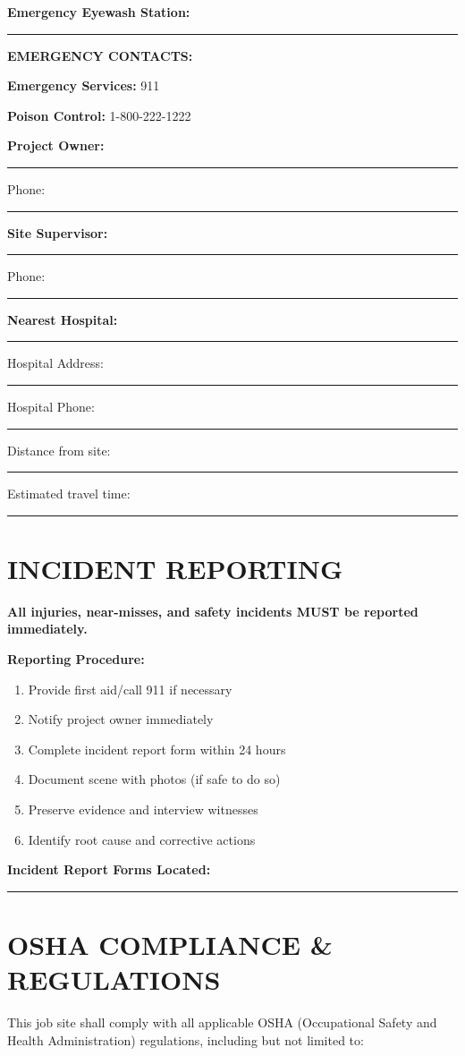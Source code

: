 \documentclass[11pt,letterpaper]{article}
\begin{document}
\textbf{Emergency Eyewash Station:} \rule{7cm}{0.4pt}

\vspace{6pt}

\textbf{EMERGENCY CONTACTS:}

\textbf{Emergency Services:} 911

\textbf{Poison Control:} 1-800-222-1222

\textbf{Project Owner:} \rule{5cm}{0.4pt} Phone: \rule{3cm}{0.4pt}

\textbf{Site Supervisor:} \rule{5cm}{0.4pt} Phone: \rule{3cm}{0.4pt}

\textbf{Nearest Hospital:} \rule{8cm}{0.4pt}

Hospital Address: \rule{9cm}{0.4pt}

Hospital Phone: \rule{5cm}{0.4pt}

Distance from site: \rule{3cm}{0.4pt} Estimated travel time: \rule{3cm}{0.4pt}

\vspace{6pt}

\section*{INCIDENT REPORTING}

\textbf{All injuries, near-misses, and safety incidents MUST be reported immediately.}

\textbf{Reporting Procedure:}

\begin{enumerate}
\item Provide first aid/call 911 if necessary
\item Notify project owner immediately
\item Complete incident report form within 24 hours
\item Document scene with photos (if safe to do so)
\item Preserve evidence and interview witnesses
\item Identify root cause and corrective actions
\end{enumerate}

\textbf{Incident Report Forms Located:} \rule{7cm}{0.4pt}

\newpage

\section*{OSHA COMPLIANCE \& REGULATIONS}

This job site shall comply with all applicable OSHA (Occupational Safety and Health Administration) regulations, including but not limited to:
\end{document}
